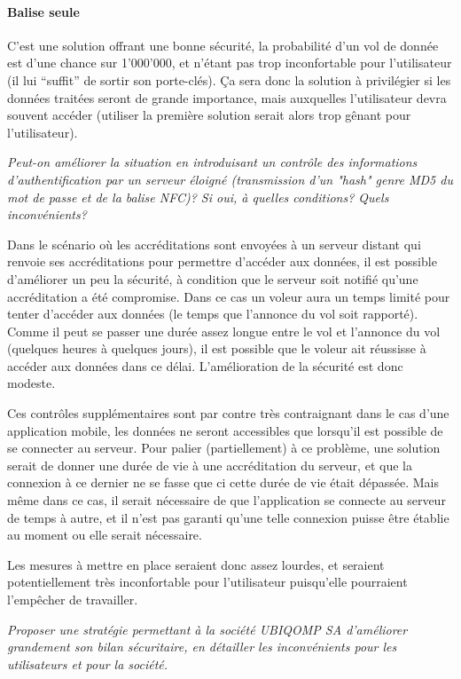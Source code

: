 \documentclass[a4paper,11pt,titlepage]{article}
\begin{document}
\paragraph{Balise seule}
C'est une solution offrant une bonne sécurité, la probabilité d'un vol de donnée est d'une chance sur 1'000'000,
et n'étant pas trop inconfortable pour l'utilisateur (il lui ``suffit'' de sortir son porte-clés). \c{C}a sera
donc la solution à privilégier si les données traitées seront de grande importance, mais auxquelles l'utilisateur
devra souvent accéder (utiliser la première solution serait alors trop gênant pour l'utilisateur).

\textit{Peut-on améliorer la situation en introduisant un contrôle des informations d'authentification par un
serveur éloigné (transmission d'un "hash" genre MD5 du mot de passe et de la balise NFC)? Si oui, à quelles
conditions? Quels inconvénients?}

Dans le scénario où les accréditations sont envoyées à un serveur distant qui renvoie ses accréditations pour
permettre d'accéder aux données, il est possible d'améliorer un peu la sécurité, à condition que le serveur soit
notifié qu'une accréditation a été compromise. Dans ce cas un voleur aura un temps limité pour tenter d'accéder
aux données (le temps que l'annonce du vol soit rapporté). Comme il peut se passer une durée assez longue entre
le vol et l'annonce du vol (quelques heures à quelques jours), il est possible que le voleur ait réussisse à
accéder aux données dans ce délai. L'amélioration de la sécurité est donc modeste.

Ces contrôles supplémentaires sont par contre très contraignant dans le cas d'une application mobile, les données
ne seront accessibles que lorsqu'il est possible de se connecter au serveur. Pour palier (partiellement) à ce
problème, une solution serait de donner une durée de vie à une accréditation du serveur, et que la connexion à ce
dernier ne se fasse que ci cette durée de vie était dépassée. Mais même dans ce cas, il serait nécessaire de que
l'application se connecte au serveur de temps à autre, et il n'est pas garanti qu'une telle connexion puisse être
établie au moment ou elle serait nécessaire.

Les mesures à mettre en place seraient donc assez lourdes, et seraient potentiellement très inconfortable pour
l'utilisateur puisqu'elle pourraient l'empêcher de travailler.

\textit{Proposer une stratégie permettant à la société UBIQOMP SA d'améliorer grandement son bilan
sécuritaire, en détailler les inconvénients pour les utilisateurs et pour la société.}
\end{document}
